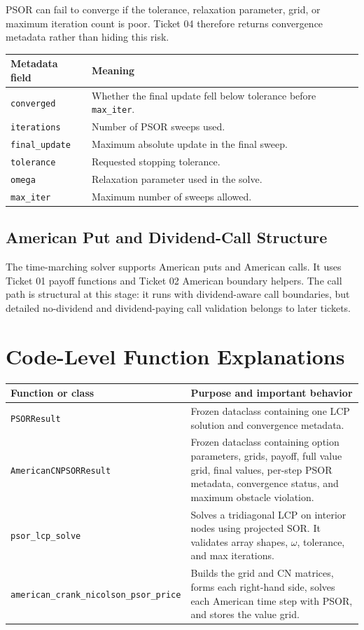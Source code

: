 \documentclass[11pt,a4paper]{article}
\newcommand{\code}[1]{\texttt{#1}}
\begin{document}
PSOR can fail to converge if the tolerance, relaxation parameter, grid, or maximum iteration count
is poor. Ticket 04 therefore returns convergence metadata rather than hiding this risk.

\begin{longtable}{L{0.24\textwidth}L{0.62\textwidth}}
\toprule
Metadata field & Meaning \\
\midrule
\endhead
\code{converged} & Whether the final update fell below tolerance before \code{max\_iter}. \\
\code{iterations} & Number of PSOR sweeps used. \\
\code{final\_update} & Maximum absolute update in the final sweep. \\
\code{tolerance} & Requested stopping tolerance. \\
\code{omega} & Relaxation parameter used in the solve. \\
\code{max\_iter} & Maximum number of sweeps allowed. \\
\bottomrule
\end{longtable}

\subsection{American Put and Dividend-Call Structure}

The time-marching solver supports American puts and American calls. It uses Ticket 01 payoff
functions and Ticket 02 American boundary helpers. The call path is structural at this stage: it
runs with dividend-aware call boundaries, but detailed no-dividend and dividend-paying call
validation belongs to later tickets.

\section{Code-Level Function Explanations}

\begin{longtable}{P{0.38\textwidth}L{0.54\textwidth}}
\toprule
Function or class & Purpose and important behavior \\
\midrule
\endhead
\code{PSORResult} &
Frozen dataclass containing one LCP solution and convergence metadata. \\
\code{AmericanCNPSORResult} &
Frozen dataclass containing option parameters, grids, payoff, full value grid, final values, per-step PSOR metadata, convergence status, and maximum obstacle violation. \\
\code{psor\_lcp\_solve} &
Solves a tridiagonal LCP on interior nodes using projected SOR. It validates array shapes, \(\omega\), tolerance, and max iterations. \\
\code{american\_crank\_nicolson\_psor\_price} &
Builds the grid and CN matrices, forms each right-hand side, solves each American time step with PSOR, and stores the value grid. \\
\bottomrule
\end{longtable}
\end{document}

